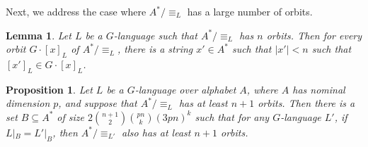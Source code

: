 \documentclass[11pt,a4paper]{amsart}
\newtheorem{lemma}{Lemma}
\newtheorem{proposition}{Proposition}
\theoremstyle{definition}
\newif\ifappendix
\begin{document}
Next, we address the case where $A^* / \equiv_L$ has a large number of orbits.

\begin{lemma} \label{lem:short witnesses to distinct equiv_L classes}
    Let $L$ be a $G$-language such that $A^* / \equiv_L$ has $n$ orbits. 
    Then for every orbit $G \cdot [x]_L$ of $A^* / \equiv_L$, there is a string $x' \in A^*$ such that $|x'| < n$ such that $[x']_L \in G \cdot [x]_L$. 
\end{lemma}

\ifappendix The proof of \autoref{lem:short witnesses to distinct equiv_L classes} is given in Appendix \ref{appendix:proof of short witnesses to distinct equiv_L classes}. \fi

\begin{proposition} \label{prop:many orbits of L witnessed by small set}
    Let $L$ be a $G$-language over alphabet $A$, where $A$ has nominal dimension $p$, and suppose that $A^* / \equiv_L$ has at least $n+1$ orbits. 
    Then there is a set $B \subseteq A^*$ of size $2 \binom{n+1}{2} \binom{pn}{k} (3pn)^k$ such that for any $G$-language $L'$, if $L|_B = L'|_B$, then $A^* / \equiv_{L'}$ also has at least $n+1$ orbits.
\end{proposition}
\end{document}
